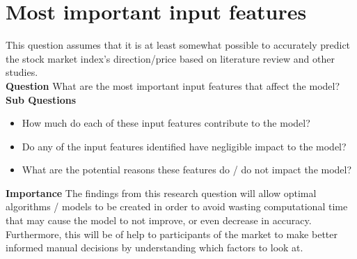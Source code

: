 \section{Most important input features} \label{most_important_features_question}
This question assumes that it is at least somewhat possible to accurately predict the stock market index's
direction/price based on literature review and other studies.\\
\textbf{Question} What are the most important input features that affect the model?\\
\textbf{Sub Questions}
\begin{itemize}
    \item How much do each of these input features contribute to the model?
    \item Do any of the input features identified have negligible impact to the model?
    \item What are the potential reasons these features do / do not impact the model?
\end{itemize}

\textbf{Importance} The findings from this research question will allow optimal algorithms /
models to be created in order to avoid wasting computational time that may cause the model to 
not improve, or even decrease in accuracy. Furthermore, this will be of help to participants of
the market to make better informed manual decisions by understanding which factors to look
at.